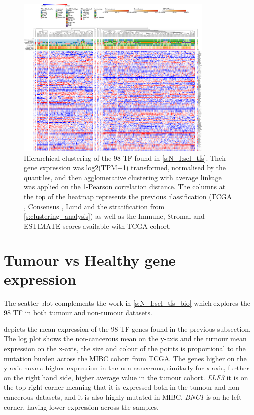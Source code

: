 \begin{figure}
    \centering
    \includegraphics[width=0.85\textwidth,keepaspectratio]{Sections/Network_I/Resources/selective_pruning/15_CS_norm_sel_tfs.png}
      \caption[Heatmap of the clustering of the gene expression of the 98 TF]{Hierarchical clustering of the 98 TF found in \cref{s:N_I:sel_tfs}. 
      Their gene expression was log2(TPM+1) transformed, normalised by the quantiles, and then agglomerative clustering with average linkage was applied on the 1-Pearson correlation distance. The columns at the top of the heatmap represents the previous classification (TCGA \cite{Robertson2017-mg}, Consensus \cite{Kamoun2020-tj}, Lund \cite{Marzouka2018-ge} and the stratification from \cref{s:clustering_analysis}) as well as the Immune, Stromal and ESTIMATE scores available with TCGA cohort.}
    \label{fig:ap:morph_sel_tfs}
\end{figure}

\section{Tumour vs Healthy gene expression} \label{s:ap:tum_vs_non-tumour}


The scatter plot complements the work in \cref{s:N_I:sel_tfs_bio} which explores the 98 TF in both tumour and non-tumour datasets.

 depicts the mean expression of the 98 TF genes found in the previous subsection. The log plot shows the non-cancerous mean on the y-axis and the tumour mean expression on the x-axis, the size and colour of the points is proportional to the mutation burden across the MIBC cohort from TCGA. The genes higher on the y-axis have a higher expression in the non-cancerous, similarly for x-axis, further on the right hand side, higher average value in the tumour cohort. \textit{ELF3} it is on the top right corner meaning that it is expressed both in the tumour and non-cancerous datasets, and it is also highly mutated in MIBC. \textit{BNC1} is on he left corner, having lower expression across the samples.

